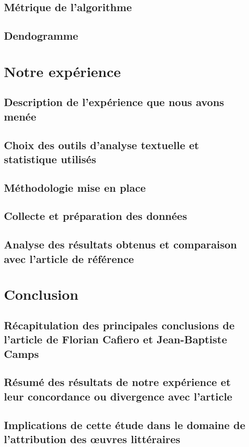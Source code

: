 \documentclass{report} %
\begin{document}
\subsection{Métrique de l'algorithme}

\subsection{Dendogramme}


\section{Notre expérience}

\vspace{\baselineskip}
\subsection{Description de l'expérience que nous avons menée}

\subsection{Choix des outils d'analyse textuelle et statistique utilisés}

\subsection{Méthodologie mise en place}

\subsection{Collecte et préparation des données}

\subsection{Analyse des résultats obtenus et comparaison avec l'article de référence}



\section{Conclusion}

\subsection{Récapitulation des principales conclusions de l'article de Florian Cafiero et Jean-Baptiste Camps}
\subsection{Résumé des résultats de notre expérience et leur concordance ou divergence avec l'article}
\subsection{Implications de cette étude dans le domaine de l'attribution des œuvres littéraires}
\end{document}
